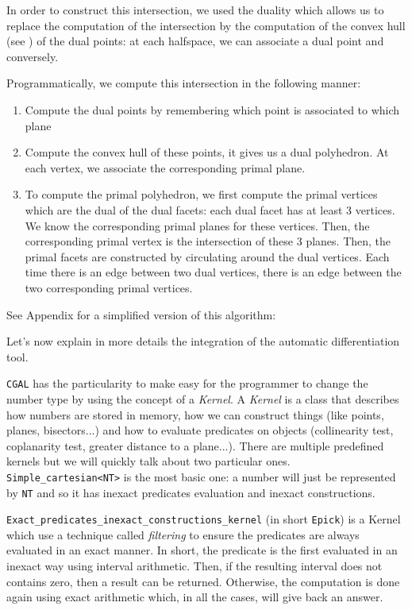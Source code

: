 In order to construct this intersection, we used the duality which allows us to
replace the computation of the intersection by the computation of the convex
hull (see \cite{preparata1979finding}) of the dual points: at each halfspace, we
can associate a dual point and conversely.

Programmatically, we compute this intersection in the following manner:
\begin{enumerate}
    \item Compute the dual points by remembering which point is associated to
        which plane
    \item Compute the convex hull of these points, it gives us a dual
        polyhedron. At each vertex, we associate the corresponding primal plane.
    \item To compute the primal polyhedron, we first compute the primal vertices
        which are the dual of the dual facets: each dual facet has at least 3
        vertices. We know the corresponding primal planes for these vertices.
        Then, the corresponding primal vertex is the intersection of these 3
        planes. Then, the primal facets are constructed by circulating around
        the dual vertices. Each time there is an edge between two dual vertices,
        there is an edge between the two corresponding primal vertices.
\end{enumerate}

See Appendix  for a simplified version of this algorithm:

Let's now explain in more details the integration of the automatic
differentiation tool.

\texttt{CGAL} has the particularity to make easy for the programmer to change
the number type by using the concept of a \emph{Kernel}. A \emph{Kernel} is a
class that describes how numbers are stored in memory, how we can construct
things (like points, planes, bisectors...) and how to evaluate predicates on
objects (collinearity test, coplanarity test, greater distance to a plane...).
There are multiple predefined kernels but we will quickly talk about two
particular ones. \texttt{Simple\_cartesian<NT>} is the most basic one: a number
will just be represented by \texttt{NT} and so it has inexact predicates
evaluation and inexact constructions.

\texttt{Exact\_predicates\_inexact\_constructions\_kernel} (in short
\texttt{Epick}) is a Kernel which use a technique called \emph{filtering} to
ensure the predicates are always evaluated in an exact manner. In short, the
predicate is the first evaluated in an inexact way using interval arithmetic.
Then, if the resulting interval does not contains zero, then a result can be
returned. Otherwise, the computation is done again using exact arithmetic which,
in all the cases, will give back an answer.

